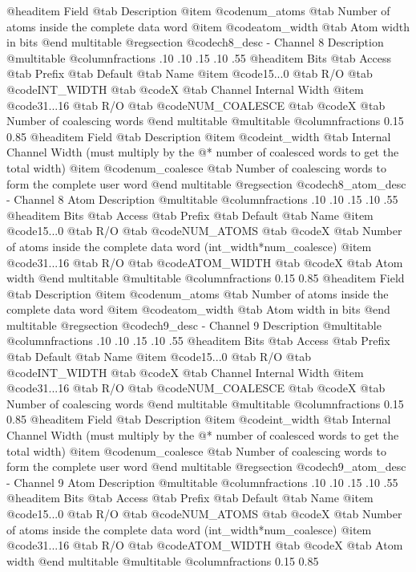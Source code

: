 @headitem Field @tab Description
@item @code{num_atoms} @tab Number of atoms inside the complete data word
@item @code{atom_width} @tab Atom width in bits
@end multitable
@regsection @code{ch8_desc} - Channel 8 Description
@multitable @columnfractions .10 .10 .15 .10 .55
@headitem Bits @tab Access @tab Prefix @tab Default @tab Name
@item @code{15...0}
@tab R/O @tab
@code{INT_WIDTH}
@tab @code{X} @tab 
Channel Internal Width
@item @code{31...16}
@tab R/O @tab
@code{NUM_COALESCE}
@tab @code{X} @tab 
Number of coalescing words
@end multitable
@multitable @columnfractions 0.15 0.85
@headitem Field @tab Description
@item @code{int_width} @tab Internal Channel Width (must multiply by the @* number of coalesced words to get the total width)
@item @code{num_coalesce} @tab Number of coalescing words to form the complete user word
@end multitable
@regsection @code{ch8_atom_desc} - Channel 8 Atom Description
@multitable @columnfractions .10 .10 .15 .10 .55
@headitem Bits @tab Access @tab Prefix @tab Default @tab Name
@item @code{15...0}
@tab R/O @tab
@code{NUM_ATOMS}
@tab @code{X} @tab 
Number of atoms inside the complete data word (int_width*num_coalesce)
@item @code{31...16}
@tab R/O @tab
@code{ATOM_WIDTH}
@tab @code{X} @tab 
Atom width
@end multitable
@multitable @columnfractions 0.15 0.85
@headitem Field @tab Description
@item @code{num_atoms} @tab Number of atoms inside the complete data word
@item @code{atom_width} @tab Atom width in bits
@end multitable
@regsection @code{ch9_desc} - Channel 9 Description
@multitable @columnfractions .10 .10 .15 .10 .55
@headitem Bits @tab Access @tab Prefix @tab Default @tab Name
@item @code{15...0}
@tab R/O @tab
@code{INT_WIDTH}
@tab @code{X} @tab 
Channel Internal Width
@item @code{31...16}
@tab R/O @tab
@code{NUM_COALESCE}
@tab @code{X} @tab 
Number of coalescing words
@end multitable
@multitable @columnfractions 0.15 0.85
@headitem Field @tab Description
@item @code{int_width} @tab Internal Channel Width (must multiply by the @* number of coalesced words to get the total width)
@item @code{num_coalesce} @tab Number of coalescing words to form the complete user word
@end multitable
@regsection @code{ch9_atom_desc} - Channel 9 Atom Description
@multitable @columnfractions .10 .10 .15 .10 .55
@headitem Bits @tab Access @tab Prefix @tab Default @tab Name
@item @code{15...0}
@tab R/O @tab
@code{NUM_ATOMS}
@tab @code{X} @tab 
Number of atoms inside the complete data word (int_width*num_coalesce)
@item @code{31...16}
@tab R/O @tab
@code{ATOM_WIDTH}
@tab @code{X} @tab 
Atom width
@end multitable
@multitable @columnfractions 0.15 0.85
